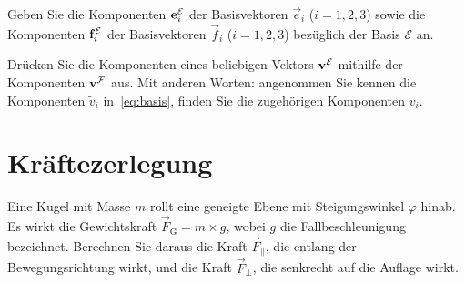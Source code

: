 \documentclass{scrartcl}
\newcommand{\ee}{\vec{e}}
\newcommand{\ff}{\vec{f}}
\begin{document}
\begin{subex}
  \item Geben Sie die Komponenten $\mathbf{e}_i^\mathcal{E}$ der Basisvektoren $\ee_i$ ($i=1,2,3$) sowie die Komponenten $\mathbf{f}_i^\mathcal{E}$ der Basisvektoren $\ff_i$ ($i=1,2,3$) bezüglich der Basis $\mathcal{E}$ an.
  \item Drücken Sie die Komponenten eines beliebigen Vektors $\mathbf{v}^\mathcal{E}$ mithilfe der Komponenten $\mathbf{v}^\mathcal{F}$ aus.
  Mit anderen Worten: angenommen Sie kennen die Komponenten $\tilde{v}_i$ in~\eqref{eq:basis}, finden Sie die zugehörigen Komponenten $v_i$. 
\end{subex}

\section{Kräftezerlegung}
Eine Kugel mit Masse $m$ rollt eine geneigte Ebene mit Steigungswinkel $\varphi$ hinab.
Es wirkt die Gewichtskraft $\vec{F}_\mathrm{G} = m \times g$, wobei $g$ die Fallbeschleunigung bezeichnet.
Berechnen Sie daraus die Kraft $\vec{F}_\parallel$, die entlang der Bewegungsrichtung wirkt, und die Kraft $\vec{F}_\perp$, die senkrecht auf die Auflage wirkt.

\begin{center}
\end{center}
\end{document}
